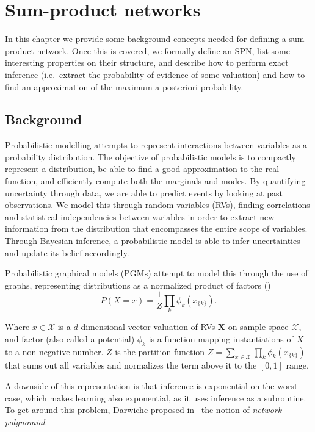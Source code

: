 \chapter{Sum-product networks}\label{chp:spn}

In this chapter we provide some background concepts needed for defining a sum-product network. Once
this is covered, we formally define an SPN, list some interesting properties on their structure,
and describe how to perform exact inference (i.e.\ extract the probability of evidence of some
valuation) and how to find an approximation of the maximum a posteriori probability.

\section{Background}

Probabilistic modelling attempts to represent interactions between variables as a probability
distribution. The objective of probabilistic models is to compactly represent a distribution, be
able to find a good approximation to the real function, and efficiently compute both the marginals
and modes. By quantifying uncertainty through data, we are able to predict events by looking at
past observations. We model this through random variables (RVs), finding correlations and
statistical independencies between variables in order to extract new information from the
distribution that encompasses the entire scope of variables. Through Bayesian inference, a
probabilistic model is able to infer uncertainties and update its belief accordingly.

Probabilistic graphical models (PGMs) attempt to model this through the use of graphs, representing
distributions as a normalized product of factors (\cite{pearl-1988})
\begin{equation*}
  P(X=x)=\frac{1}{Z}\prod_k \phi_k(x_{\{k\}}).
\end{equation*}

Where $x\in\mathcal{X}$ is a $d$-dimensional vector valuation of RVs $\mathbf{X}$ on sample space
$\mathcal{X}$, and factor (also called a potential) $\phi_k$ is a function mapping instantiations
of $X$ to a non-negative number. $Z$ is the partition function $Z=\sum_{x\in\mathcal{X}} \prod_k
\phi_k(x_{\{k\}})$ that sums out all variables and normalizes the term above it to the $[0,1]$
range.

A downside of this representation is that inference is exponential on the worst case, which makes
learning also exponential, as it uses inference as a subroutine. To get around this problem,
Darwiche proposed in~\cite{diff-approach-darwiche} the notion of \textit{network polynomial}.

